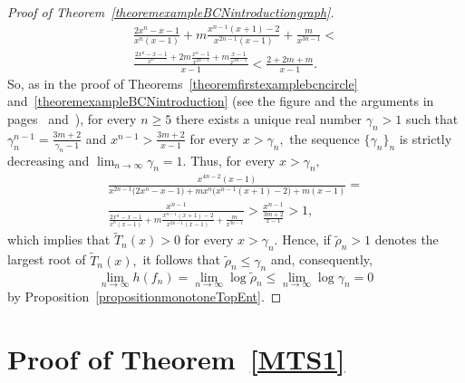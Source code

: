 \documentclass[a4paper, 11pt]{amsart}
\numberwithin{equation}{section}
\theoremstyle{customnumberedtheorem}
\theoremstyle{definitionwithbfnote}
\begin{document}
\begin{proof}[Proof of Theorem~\ref{theoremexampleBCNintroductiongraph}]
\begin{multline*}
 \frac{2x^{n}-x-1}{x^n(x-1)} + m \frac{x^{n-1}(x+1)-2}{x^{2n-1}(x-1)} + \frac{m}{x^{3n-1}} <\\[1ex]
 \frac{\tfrac{2x^{n}-x-1}{x^{n}} + 2m \tfrac{x^{n}-1}{x^{2n-1}} + m \tfrac{x-1}{x^{3n-1}}}{x-1} <
 \frac{2 + 2m + m}{x-1}.
\end{multline*}
So, as in the proof of Theorems~\ref{theoremfirstexamplebcncircle}
and~\ref{theoremexampleBCNintroduction}
(see the figure and the arguments in pages~\pageref{fig:arrels}
and~\pageref{zerosarguments}),
for every $n \ge 5$ there exists a unique real
number $\gamma_n > 1$ such that
$\gamma_n^{n-1} = \tfrac{3m+2}{\gamma_n -1}$ and
$x^{n-1} > \tfrac{3m+2}{x-1}$ for every $x > \gamma_n,$
the sequence $\{\gamma_n\}_n$ is strictly decreasing and
$\lim_{n\to\infty} \gamma_n = 1.$
Thus, for every $x > \gamma_n,$
\begin{multline*}
 \frac{x^{4n-2}(x-1)}{x^{2n-1}\bigl(2x^{n}-x-1\bigr) + m x^{n}\bigl(x^{n-1}(x+1)-2\bigr) + m(x-1)} = \\
 \frac{x^{n-1}}{\tfrac{2x^{n}-x-1}{x^n(x-1)} + m \tfrac{x^{n-1}(x+1)-2}{x^{2n-1}(x-1)} + \tfrac{m}{x^{3n-1}}} >
 \frac{x^{n-1}}{\tfrac{3m+2}{x-1}} > 1,
\end{multline*}
which implies that $\widetilde{T}_n(x) > 0$ for every $x > \gamma_n.$
Hence,
if $\tilde{\rho}_n > 1$ denotes the largest root of $\widetilde{T}_n(x),$
it follows that $\tilde{\rho}_n \le \gamma_n$ and, consequently,
\[
 \lim_{n\to\infty} h(f_n) = \lim_{n\to\infty} \log\tilde{\rho}_n  \le \lim_{n\to\infty} \log\gamma_n = 0
\]
by Proposition~\ref{propositionmonotoneTopEnt}.
\end{proof}

\section{Proof of Theorem~\ref{MTS1}}\label{sectiontheorem}
\end{document}
